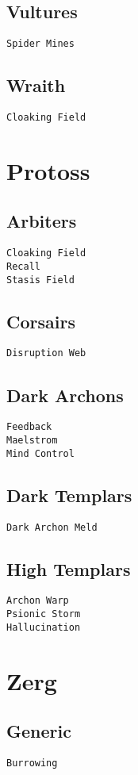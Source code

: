 \subsection{Vultures}
\verb|Spider Mines|

\subsection{Wraith}
\verb|Cloaking Field| 

\section{Protoss}

\subsection{Arbiters}
\verb|Cloaking Field| \\
\verb|Recall| \\
\verb|Stasis Field|

\subsection{Corsairs}
\verb|Disruption Web|

\subsection{Dark Archons}
\verb|Feedback| \\
\verb|Maelstrom| \\
\verb|Mind Control|

\subsection{Dark Templars}
\verb|Dark Archon Meld|

\subsection{High Templars}
\verb|Archon Warp| \\
\verb|Psionic Storm| \\
\verb|Hallucination|

\section{Zerg}

\subsection{Generic}
\verb|Burrowing|

